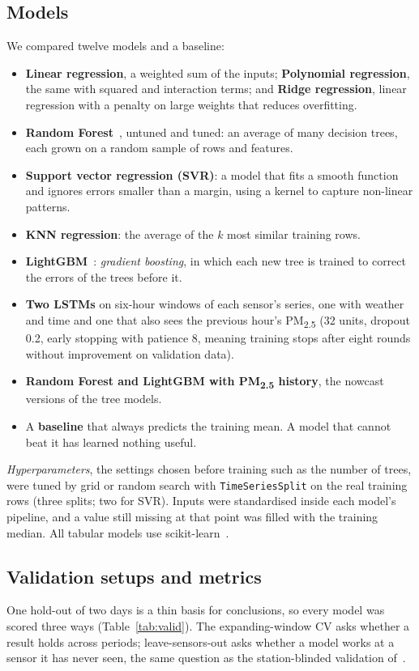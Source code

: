 \documentclass{ieeeaccess}
\newcommand{\pmtwo}{PM\textsubscript{2.5}}
\begin{document}
\subsection{Models}
\label{sec:models}
We compared twelve models and a baseline:
\begin{itemize}
\item \textbf{Linear regression}, a weighted sum of the inputs; \textbf{Polynomial regression}, the same with squared and interaction terms; and \textbf{Ridge regression}, linear regression with a penalty on large weights that reduces overfitting.
\item \textbf{Random Forest}~\cite{breiman2001}, untuned and tuned: an average of many decision trees, each grown on a random sample of rows and features.
\item \textbf{Support vector regression (SVR)}: a model that fits a smooth function and ignores errors smaller than a margin, using a kernel to capture non-linear patterns.
\item \textbf{KNN regression}: the average of the $k$ most similar training rows.
\item \textbf{LightGBM}~\cite{ke2017}: \emph{gradient boosting}, in which each new tree is trained to correct the errors of the trees before it.
\item \textbf{Two LSTMs} on six-hour windows of each sensor's series, one with weather and time and one that also sees the previous hour's \pmtwo{} (32 units, dropout 0.2, early stopping with patience 8, meaning training stops after eight rounds without improvement on validation data).
\item \textbf{Random Forest and LightGBM with \pmtwo{} history}, the nowcast versions of the tree models.
\item A \textbf{baseline} that always predicts the training mean. A model that cannot beat it has learned nothing useful.
\end{itemize}
\emph{Hyperparameters}, the settings chosen before training such as the number of trees, were tuned by grid or random search with \texttt{TimeSeriesSplit} on the real training rows (three splits; two for SVR). Inputs were standardised inside each model's pipeline, and a value still missing at that point was filled with the training median. All tabular models use scikit-learn~\cite{pedregosa2011}.

\subsection{Validation setups and metrics}
\label{sec:valid}
One hold-out of two days is a thin basis for conclusions, so every model was scored three ways (Table~\ref{tab:valid}). The expanding-window CV asks whether a result holds across periods; leave-sensors-out asks whether a model works at a sensor it has never seen, the same question as the station-blinded validation of~\cite{gurtepe2025}.
\end{document}
